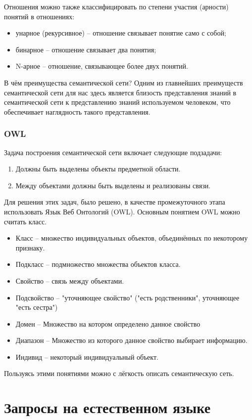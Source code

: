 Отношения можно также классифицировать по степени участия (арности) понятий в отношениях:
\begin{itemize}
\item унарное (рекурсивное) -- отношение связывает понятие само с собой;

\item бинарное -- отношение связывает два понятия;

\item N-арное -- отношение, связывающее более двух понятий.
\end{itemize}
В чём преимущества семантической сети?
Одним из главнейших преимуществ семантической сети для нас здесь является 
близость представления знаний в семантической сети к представлению знаний
используемом человеком, что обеспечивает наглядность такого представления.

\subsubsection{OWL}
Задача построения семантической сети включает следующие подзадачи:
\begin{enumerate}
\item Должны быть выделены объекты предметной области.
\item Между объектами должны быть выделены и реализованы связи.
\end{enumerate}
Для решения этих задач, было решено, в качестве промежуточного этапа использовать Язык Веб Онтологий (OWL).
Основным понятием OWL можно считать класс.
\begin{itemize}
\item Класс -- множество индивидуальных объектов, объединённых по некоторому признаку.
\item Подкласс -- подмножество множества объектов класса.
\item Свойство -- связь между объектами.
\item Подсвойство -- "уточняющее свойство" ("есть родственники", уточняющее "есть 
сестра")
\item Домен -- Множество на котором определено данное свойство
\item Диапазон -- Множество из которого данное свойство выбирает информацию.
\item Индивид -- некоторый индивидуальный объект.
\end{itemize} 
Пользуясь этими понятиями можно с лёгкость описать семантическую сеть.
\section{Запросы на естественном языке}
